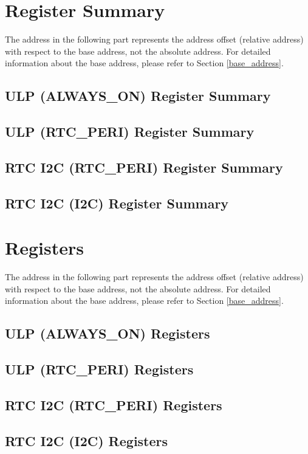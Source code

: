 \documentclass[main\_\_EN.tex]{subfiles}
\begin{document}
\hypertarget{ulp-reg-summ}{}
\section{Register Summary}
\label{ulp-reg-summ}


The address in the following part represents the address offset (relative address) with respect to the base address, not the absolute address. For detailed information about the base address, please refer to Section \ref{base_address}.

\subsection{ULP (ALWAYS\_ON) Register Summary}


\subsection{ULP (RTC\_PERI) Register Summary}


\subsection{RTC I2C (RTC\_PERI) Register Summary}


\subsection{RTC I2C (I2C) Register Summary}


\section{Registers}

The address in the following part represents the address offset (relative address) with respect to the base address, not the absolute address. For detailed information about the base address, please refer to Section \ref{base_address}.

\subsection{ULP (ALWAYS\_ON) Registers}


\subsection{ULP (RTC\_PERI) Registers}


\subsection{RTC I2C (RTC\_PERI) Registers}


\subsection{RTC I2C (I2C) Registers}

\end{document}
